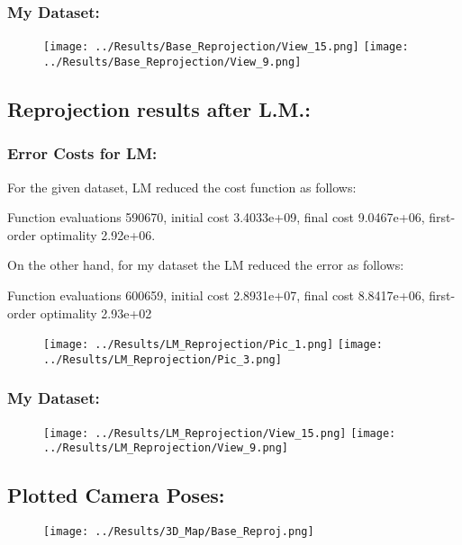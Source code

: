 \documentclass{article}
\begin{document}
\subsubsection*{My Dataset:}
\begin{figure}[H]
    \centering
    \texttt{[image: ../Results/Base\_Reprojection/View\_15.png]}
    \texttt{[image: ../Results/Base\_Reprojection/View\_9.png]}
\end{figure}


\subsection{Reprojection results after L.M.:}
\subsubsection{Error Costs for LM:}
For the given dataset, LM reduced the cost function as follows:


Function evaluations 590670, initial cost 3.4033e+09, final cost 9.0467e+06, first-order optimality 2.92e+06.

On the other hand, for my dataset the LM reduced the error as follows:


Function evaluations 600659, initial cost 2.8931e+07, final cost 8.8417e+06, first-order optimality 2.93e+02
\begin{figure}[H]
    \centering
    \texttt{[image: ../Results/LM\_Reprojection/Pic\_1.png]}
    \texttt{[image: ../Results/LM\_Reprojection/Pic\_3.png]}
\end{figure}

\subsubsection*{My Dataset:}
\begin{figure}[H]
    \centering
    \texttt{[image: ../Results/LM\_Reprojection/View\_15.png]}
    \texttt{[image: ../Results/LM\_Reprojection/View\_9.png]}
\end{figure}

\subsection{Plotted Camera Poses:}
\begin{figure}[H]
    \centering
    \texttt{[image: ../Results/3D\_Map/Base\_Reproj.png]}
\end{figure}
\end{document}
